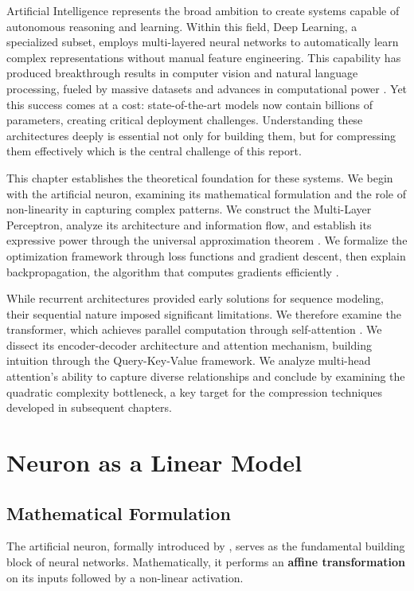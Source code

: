 

Artificial Intelligence represents the broad ambition to create systems capable of autonomous reasoning and learning. Within this field, Deep Learning, a specialized subset, employs multi-layered neural networks to automatically learn complex representations without manual feature engineering. This capability has produced breakthrough results in computer vision and natural language processing, fueled by massive datasets and advances in computational power \cite{Goodfellow2016}. Yet this success comes at a cost: state-of-the-art models now contain billions of parameters, creating critical deployment challenges. Understanding these architectures deeply is essential not only for building them, but for compressing them effectively which is the central challenge of this report.

This chapter establishes the theoretical foundation for these systems. We begin with the artificial neuron, examining its mathematical formulation and the role of non-linearity in capturing complex patterns. We construct the Multi-Layer Perceptron, analyze its architecture and information flow, and establish its expressive power through the universal approximation theorem \cite{hornik1989}. We formalize the optimization framework through loss functions and gradient descent, then explain backpropagation, the algorithm that computes gradients efficiently \cite{Rumelhart1986}. 

While recurrent architectures provided early solutions for sequence modeling, their sequential nature imposed significant limitations. We therefore examine the transformer, which achieves parallel computation through self-attention \cite{vaswani2017attention}. We dissect its encoder-decoder architecture and attention mechanism, building intuition through the Query-Key-Value framework. We analyze multi-head attention's ability to capture diverse relationships and conclude by examining the quadratic complexity bottleneck, a key target for the compression techniques developed in subsequent chapters.

\newpage
\section{Neuron as a Linear Model}

\subsection{Mathematical Formulation}
The artificial neuron, formally introduced by \cite{McCulloch1943}, serves as the fundamental building block of neural networks. Mathematically, it performs an \textbf{affine transformation} on its inputs followed by a non-linear activation.

